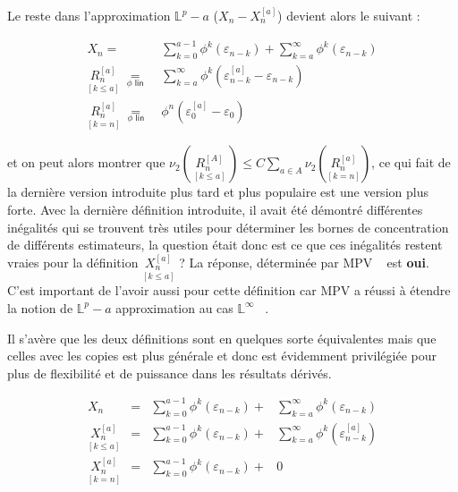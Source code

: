 Le reste dans l'approximation $\mathds L^p-a$ ($X_n - X_n^{[a]}$) devient alors le suivant :

\begin{align*}
    X_n = &\sum\limits_{k=0}^{a-1} \phi^k( \varepsilon_{n-k}) + \sum\limits_{k=a}^{\infty} \phi^k( \varepsilon_{n-k})
    \\
    \underset {[k\leq a]} {R_n^{[a]}} \; \underset {\phi \textsf{ lin}}{=} \; &\sum\limits_{k=a}^{\infty} \phi^k( \varepsilon_{n-k}^{[a]} - \varepsilon_{n-k})
    \\
    \underset {[k = n]} {R_n^{[a]}} \; \underset {\phi \textsf{ lin}}{=} \; &\phi^n( \varepsilon_{0}^{[a]} - \varepsilon_0)
\end{align*}


et on peut alors montrer que $\nu_2\left( \,\underset {[k\leq a]} {R_n^{[A]}} \, \right) \leq C \sum\limits_{a \in A} \nu_2 \left( \underset {[k = n]} {R_n^{[a]}} \right)$, ce qui fait de la dernière version introduite plus tard et plus populaire est une version plus forte. Avec la dernière définition introduite, il avait été démontré différentes inégalités qui se trouvent très utiles pour déterminer les bornes de concentration de différents estimateurs, la question était donc est ce que ces inégalités restent vraies pour la définition $\underset {[k\leq a]} {X_n^{[a]}}$ ? La réponse, déterminée par MPV ~\cite{maissoro-SmoothnessFTSweakDep} est \textbf{oui}. C'est important de l'avoir aussi pour cette définition car MPV a réussi à étendre la notion de $\mathds L^p-a$ approximation au cas $\mathds L^\infty$ ~\cite{maissoro-SmoothnessFTSweakDep}.


Il s'avère que les deux définitions sont en quelques sorte \og équivalentes \fg mais que celles avec les copies est plus générale et donc est évidemment privilégiée pour plus de flexibilité et de puissance dans les résultats dérivés.

\begin{align*}
    X_n &= &\sum\limits_{k=0}^{a-1} \phi^k( \varepsilon_{n-k}) + & \sum\limits_{k=a}^{\infty} \phi^k( \varepsilon_{n-k})
    \\
    \underset {[k\leq a]} {X_n^{[a]}} &= &\sum\limits_{k=0}^{a-1} \phi^k( \varepsilon_{n-k}) + & \sum\limits_{k=a}^{\infty} \phi^k( \varepsilon_{n-k}^{[a]})
    \\
    \underset {[k = n]} {X_n^{[a]}} &= &\sum\limits_{k=0}^{a-1} \phi^k( \varepsilon_{n-k}) + & 0
\end{align*}

